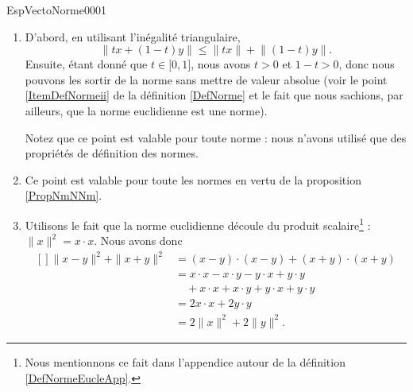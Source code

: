 \begin{corrige}{EspVectoNorme0001}

	\begin{enumerate}
		\item
			D'abord, en utilisant l'inégalité triangulaire, 
			\begin{equation}
				\| tx+(1-t)y \|\leq \| tx \|+\big\| (1-t)y \big\|.
			\end{equation}
			Ensuite, étant donné que $t\in\mathopen[ 0 , 1 \mathclose]$, nous avons $t>0$ et $1-t>0$, donc nous pouvons les sortir de la norme sans mettre de valeur absolue (voir le point \ref{ItemDefNormeii} de la définition \ref{DefNorme} et le fait que nous sachions, par ailleurs, que la norme euclidienne est une norme).

			Notez que ce point est valable pour toute norme : nous n'avons utilisé que des propriétés de définition des normes.


		\item
			Ce point est valable pour toute les normes en vertu de la proposition \ref{PropNmNNm}.

		\item
			Utilisons le fait que la norme euclidienne découle du produit scalaire\footnote{Nous mentionnons ce fait dans l'appendice autour de la définition \ref{DefNormeEucleApp}.} : $\| x \|^2=x\cdot x$. Nous avons donc
			\begin{equation}
				\begin{aligned}[]
					\| x-y \|^2+\| x+y \|^2&=(x-y)\cdot (x-y)+(x+y)\cdot(x+y)\\
					&=x\cdot x-x\cdot y-y\cdot x+y\cdot y\\
					&\quad +x\cdot x+x\cdot y+y\cdot x+y\cdot y\\
					&=2x\cdot x+2y\cdot y\\
					&=2\| x \|^2+2\| y \|^2.
				\end{aligned}
			\end{equation}
			
	\end{enumerate}

\end{corrige}
